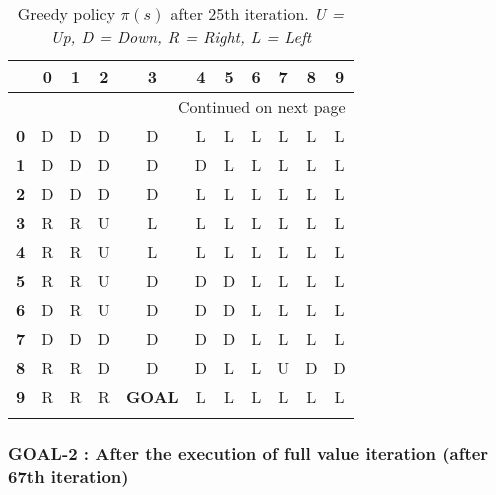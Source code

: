 \documentclass{article}
\begin{document}
\begin{longtable}{|c|c|c|c|c|c|c|c|c|c|c|}
\toprule
{} &  0 &  1 &  2 &  3 &  4 &  5 &  6 &  7 &  8 &  9 \\
\midrule
\endhead
\midrule
\multicolumn{11}{r}{{Continued on next page}} \\
\midrule
\endfoot

\bottomrule
\endlastfoot
\textbf{0} &  D &  D &  D &  D &  L &  L &  L &  L &  L &  L \\\hline
\textbf{1} &  D &  D &  D &  D &  D &  L &  L &  L &  L &  L \\\hline
\textbf{2} &  D &  D &  D &  D &  L &  L &  L &  L &  L &  L \\\hline
\textbf{3} &  R &  R &  U &  L &  L &  L &  L &  L &  L &  L \\\hline
\textbf{4} &  R &  R &  U &  L &  L &  L &  L &  L &  L &  L \\\hline
\textbf{5} &  R &  R &  U &  D &  D &  D &  L &  L &  L &  L \\\hline
\textbf{6} &  D &  R &  U &  D &  D &  D &  L &  L &  L &  L \\\hline
\textbf{7} &  D &  D &  D &  D &  D &  D &  L &  L &  L &  L \\\hline
\textbf{8} &  R &  R &  D &  D &  D &  L &  L &  U &  D &  D \\\hline
\textbf{9} &  R &  R &  R &  \textbf{GOAL} &  L &  L &  L &  L &  L &  L \\\hline
\caption{Greedy policy $\pi(s)$ after 25th iteration. \textit{U = Up, D = Down, R = Right, L = Left}}
\end{longtable}

\subsubsection*{GOAL-2 : After the execution of full value iteration (after 67th iteration)}
\end{document}
